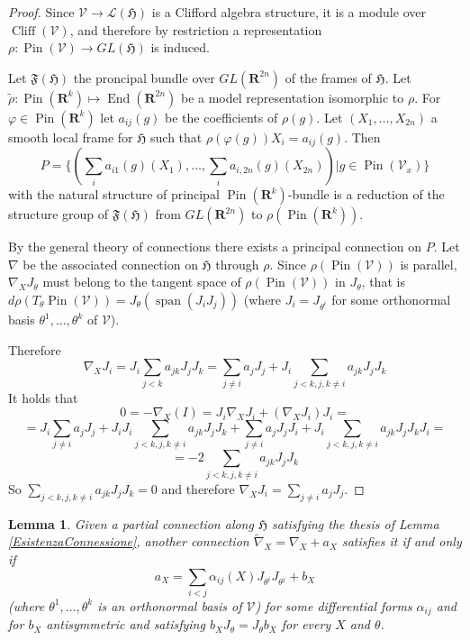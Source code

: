 \documentclass{article}
\newcommand{\ci}[1]{\mathscr{#1}}%
\newcommand{\g}[1]{\mathfrak{#1}}
\newcommand{\alfa}{\alpha}
\newcommand{\R}{\mathbf{R}}
\renewcommand{\phi}{\varphi}
\newtheorem{lemma}[proposizione]{Lemma}
\theoremstyle{definition}
\theoremstyle{remark}
\begin{document}
\begin{proof}
 Since $\ci{V}\to\ci{L}(\g{H})$ is a Clifford algebra structure, it is a module over $\operatorname{Cliff}(\ci{V})$, and therefore by restriction a representation $\rho:\operatorname{Pin}(\ci{V})\to GL(\g{H})$ is induced.

 Let $\g{F}(\g{H})$ the proncipal bundle over $GL(\R^{2n})$ of the frames of $\g{H}$.
 Let $\widetilde{\rho}:\operatorname{Pin}(\R^k)\mapsto\operatorname{End}(\R^{2n})$ be a model representation isomorphic to $\rho$. For $\phi\in\operatorname{Pin}(\R^k)$ let $a_{ij}(g)$ be the coefficients of $\rho(g)$.
 Let $(X_1,\ldots,X_{2n})$ a smooth local frame for $\g{H}$ such that $\rho(\phi(g))X_i = a_{ij}(g)$.
 Then
 $$P=\{ (\sum_ia_{i1}(g)(X_1),\ldots,\sum_ia_{i,2n}(g)(X_{2n})) | g\in\operatorname{Pin}(\ci{V}_x)\}$$
 with the natural structure of principal $\operatorname{Pin}(\R^k)$-bundle is a reduction of the structure group of $\g{F}(\g{H})$ from $GL(\R^{2n})$ to $\rho(\operatorname{Pin}(\R^k))$.
 
 By the general theory of connections there exists a principal connection on $P$. Let $\nabla$ be the associated connection on $\g{H}$ through $\rho$. Since $\rho(\operatorname{Pin}(\ci{V}))$ is parallel, $\nabla_XJ_{\theta}$ must belong to the tangent space of $\rho(\operatorname{Pin}(\ci{V}))$ in $J_{\theta}$, that is $d\rho(T_{\theta}\operatorname{Pin}(\ci{V}))=J_\theta(\operatorname{span}(J_iJ_j))$ (where $J_i=J_{\theta^i}$ for some orthonormal basis $\theta^1,\ldots,\theta^k$ of $\ci{V}$).
 
 Therefore
 $$\nabla_XJ_i = J_i\sum_{j<k}a_{jk}J_jJ_k = \sum_{j\ne i}a_jJ_j + J_i\sum_{j<k,j,k\ne i}a_{jk}J_jJ_k $$
 It holds that
 $$0= -\nabla_X(I) = J_i\nabla_XJ_i + (\nabla_XJ_i)J_i =$$
 $$= J_i\sum_{j\ne i}a_jJ_j + J_iJ_i\sum_{j<k,j,k\ne i}a_{jk}J_jJ_k + \sum_{j\ne i}a_jJ_jJ_i + J_i\sum_{j<k,j,k\ne i}a_{jk}J_jJ_kJ_i =$$
 $$= -2\sum_{j<k,j,k\ne i}a_{jk}J_jJ_k $$
 So $\sum_{j<k,j,k\ne i}a_{jk}J_jJ_k=0$ and therefore $\nabla_XJ_i = \sum_{j\ne i}a_jJ_j$.
\end{proof}

\begin{lemma}\label{LemmaConnessione}
 Given a partial connection along $\g{H}$ satisfying the thesis of Lemma \ref{EsistenzaConnessione}, another connection $\widetilde{\nabla}_X=\nabla_X+a_X$ satisfies it if and only if
 $$a_X = \sum_{i<j}\alfa_{ij}(X)J_{\theta^i}J_{\theta^j} +b_X$$
 (where $\theta^1,\ldots,\theta^k$ is an orthonormal basis of $\ci{V}$)
 for some differential forms $\alfa_{ij}$ and for $b_X$ antisymmetric and satisfying $b_XJ_{\theta}=J_{\theta}b_X$ for every $X$ and $\theta$.
\end{lemma}
\end{document}
